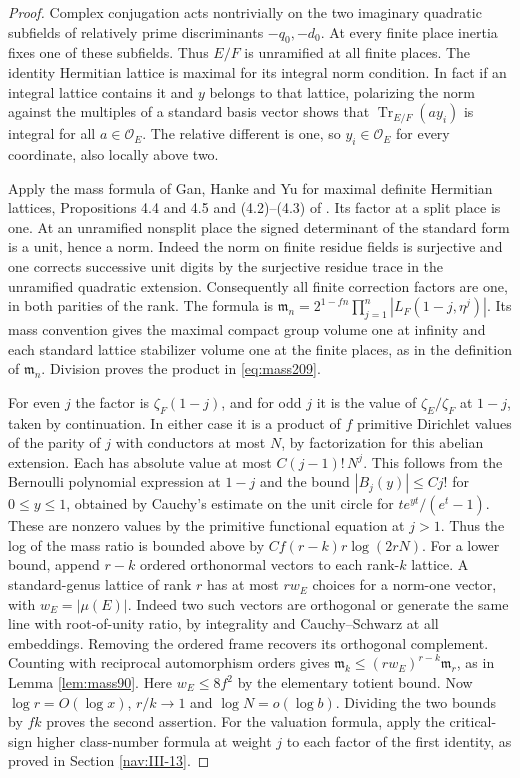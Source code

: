 \documentclass[a4paper,11pt]{article}
\theoremstyle{definition}
\theoremstyle{remark}
\numberwithin{equation}{section}
\begin{document}
\begin{proof}
Complex conjugation acts nontrivially on the two imaginary quadratic
subfields of relatively prime discriminants \(-q_0,-d_0\).
At every finite place inertia fixes one of these subfields. Thus
\(E/F\) is unramified at all finite places. The identity Hermitian
lattice is maximal for its integral norm condition. In fact if
an integral lattice contains it and \(y\) belongs to that lattice,
polarizing the norm against the multiples of a standard basis
vector shows that \(\operatorname{Tr}_{E/F}(a y_i)\) is integral
for all \(a\in\mathcal O_E\). The relative different is one,
so \(y_i\in\mathcal O_E\) for every coordinate, also locally
above two.

Apply the mass formula of Gan, Hanke and Yu for maximal definite
Hermitian lattices, Propositions 4.4 and 4.5 and (4.2)--(4.3)
of \cite{XVIII-XIII-IV-ghy209}. Its factor at a split place is one. At an
unramified nonsplit place the signed determinant of the standard
form is a unit, hence a norm. Indeed the norm on finite residue
fields is surjective and one corrects successive unit digits
by the surjective residue trace in the unramified quadratic
extension. Consequently all finite correction factors are one,
in both parities of the rank. The formula is
\(\mathfrak m_n=2^{1-fn}\prod_{j=1}^n |L_F(1-j,\eta^j)|\).
Its mass convention gives the maximal compact group volume one
at infinity and each standard lattice stabilizer volume one at
the finite places, as in the definition of \(\mathfrak m_n\).
Division proves the product in \eqref{eq:mass209}.

For even \(j\) the factor is \(\zeta_F(1-j)\), and for odd \(j\)
it is the value of \(\zeta_E/\zeta_F\) at \(1-j\), taken by
continuation. In either case it is a product of \(f\) primitive
Dirichlet values of the parity of \(j\) with conductors at most
\(N\), by factorization for this abelian extension. Each has
absolute value at most \(C(j-1)!\,N^j\). This follows from
the Bernoulli polynomial expression at \(1-j\) and the bound
\(|B_j(y)|\le Cj!\) for \(0\le y\le1\), obtained by Cauchy's
estimate on the unit circle for
\(t e^{yt}/(e^t-1)\). These are nonzero values by the primitive
functional equation at \(j>1\). Thus the log of the mass ratio
is bounded above by \(C f(r-k)r\log(2rN)\).
For a lower bound, append \(r-k\) ordered orthonormal vectors
to each rank-\(k\) lattice. A standard-genus lattice of rank
\(r\) has at most \(rw_E\) choices for a norm-one vector, with
\(w_E=|\mu(E)|\). Indeed two such vectors are orthogonal or
generate the same line with root-of-unity ratio, by integrality
and Cauchy--Schwarz at all embeddings. Removing the ordered
frame recovers its orthogonal complement. Counting with reciprocal
automorphism orders gives
\(\mathfrak m_k\le(rw_E)^{r-k}\mathfrak m_r\), as in
Lemma \ref{lem:mass90}.
Here \(w_E\le8f^2\) by the elementary totient bound. Now
\(\log r=O(\log x)\), \(r/k\to1\) and \(\log N=o(\log b)\).
Dividing the two bounds by \(fk\) proves the second assertion.
For the valuation formula, apply the critical-sign higher
class-number formula at weight \(j\) to each factor of the
first identity, as proved in
Section \ref{nav:III-13}.
\end{proof}
\end{document}
